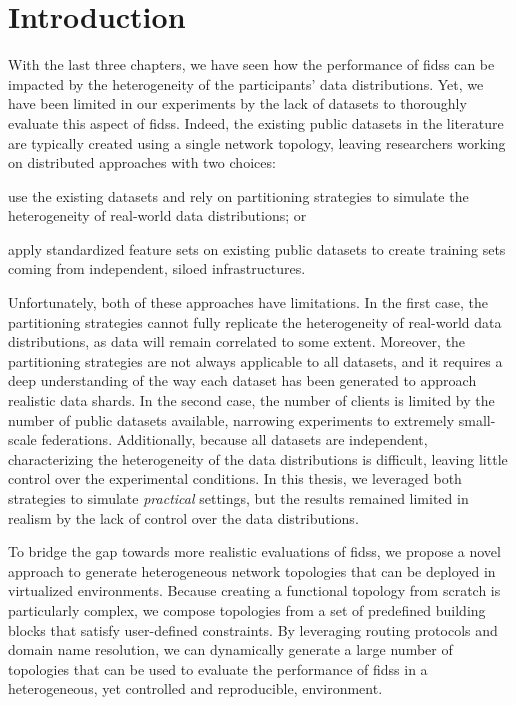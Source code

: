 \section{Introduction\label{sec:topologies.intro}}

With the last three chapters, we have seen how the performance of \glspl{fids} can be impacted by the heterogeneity of the participants' data distributions.
Yet, we have been limited in our experiments by the lack of datasets to thoroughly evaluate this aspect of \glspl{fids}.
Indeed, the existing public datasets in the literature are typically created using a single network topology, leaving researchers working on distributed approaches with two choices:
\begin{enumerate*}[(a)]
    \item use the existing datasets and rely on partitioning strategies to simulate the heterogeneity of real-world data distributions; or
    \item apply standardized feature sets on existing public datasets to create training sets coming from independent, siloed infrastructures.
\end{enumerate*}

Unfortunately, both of these approaches have limitations.
In the first case, the partitioning strategies cannot fully replicate the heterogeneity of real-world data distributions, as data will remain correlated to some extent.
Moreover, the partitioning strategies are not always applicable to all datasets, and it requires a deep understanding of the way each dataset has been generated to approach realistic data shards.
In the second case, the number of clients is limited by the number of public datasets available, narrowing experiments to extremely small-scale federations.
Additionally, because all datasets are independent, characterizing the heterogeneity of the data distributions is difficult, leaving little control over the experimental conditions.
In this thesis, we leveraged both strategies to simulate \emph{practical}  settings, but the results remained limited in realism by the lack of control over the data distributions.

To bridge the gap towards more realistic evaluations of \glspl{fids}, we propose a novel approach to generate heterogeneous network topologies that can be deployed in virtualized environments.
Because creating a functional topology from scratch is particularly complex, we compose topologies from a set of predefined building blocks that satisfy user-defined constraints.
By leveraging routing protocols and domain name resolution, we can dynamically generate a large number of topologies that can be used to evaluate the performance of \glspl{fids} in a heterogeneous, yet controlled and reproducible, environment.

